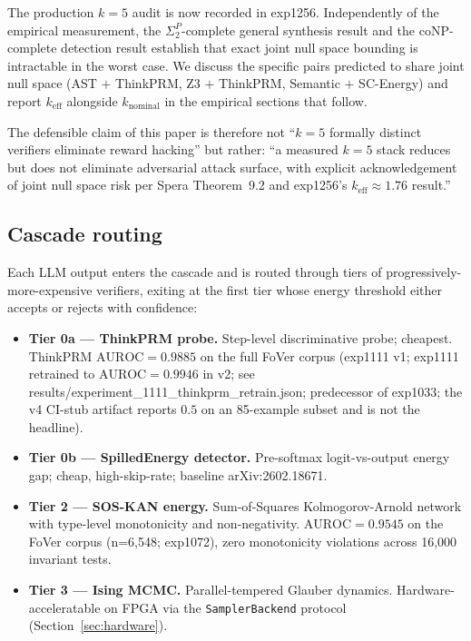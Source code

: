 \documentclass[10pt]{article}
\begin{document}
The production $k=5$ audit is now recorded in exp1256. Independently
of the empirical measurement, the
$\Sigma_2^{P}$-complete general synthesis result and the
$\mathrm{coNP}$-complete detection result establish that exact joint
null space bounding is intractable in the worst case. We discuss the
specific pairs predicted to share joint null space
(AST $+$ ThinkPRM, Z3 $+$ ThinkPRM, Semantic $+$ SC-Energy) and
report $k_{\text{eff}}$ alongside $k_{\text{nominal}}$ in the
empirical sections that follow.

The defensible claim of this paper is therefore not ``$k=5$ formally
distinct verifiers eliminate reward hacking'' but rather: ``a measured
$k=5$ stack reduces but does not eliminate adversarial attack surface,
with explicit acknowledgement of joint null space risk per Spera
Theorem~9.2 and exp1256's $k_{\text{eff}} \approx 1.76$ result.''

\subsection{Cascade routing}

Each LLM output enters the cascade and is routed through tiers of
progressively-more-expensive verifiers, exiting at the first tier
whose energy threshold either accepts or rejects with confidence:

\begin{itemize}
  \item \textbf{Tier 0a --- ThinkPRM probe.} Step-level discriminative
        probe; cheapest. ThinkPRM $\mathrm{AUROC}=0.9885$ on the full
        FoVer corpus (exp1111 v1; exp1111 retrained to
        $\mathrm{AUROC}=0.9946$ in v2; see
        results/experiment\_1111\_thinkprm\_retrain.json;
        predecessor of exp1033; the v4 CI-stub artifact
        reports $0.5$ on an 85-example subset and is not the
        headline).
  \item \textbf{Tier 0b --- SpilledEnergy detector.} Pre-softmax
        logit-vs-output energy gap; cheap, high-skip-rate; baseline
        arXiv:2602.18671.
  \item \textbf{Tier 2 --- SOS-KAN energy.} Sum-of-Squares
        Kolmogorov-Arnold network with type-level monotonicity and
        non-negativity. $\mathrm{AUROC} = 0.9545$ on the FoVer corpus
        (n=6{,}548; exp1072), zero monotonicity violations across 16{,}000
        invariant tests.
  \item \textbf{Tier 3 --- Ising MCMC.} Parallel-tempered Glauber
        dynamics. Hardware-acceleratable on FPGA via the
        \texttt{SamplerBackend} protocol (Section~\ref{sec:hardware}).
\end{itemize}
\end{document}
